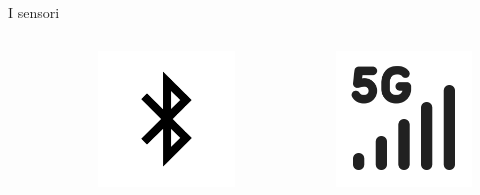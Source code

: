 \documentclass{beamer}
\begin{document}
\begin{frame}{I sensori}
\begin{columns}
\begin{column}{0.15\linewidth}
\begin{figure}
        \end{figure}
    \end{column}
    \begin{column}{0.15\linewidth}
        \begin{figure}
            \centering
            \includegraphics[width=0.9\linewidth]{assets/ic_bluetooth.png}
        \end{figure}
    \end{column}
    \begin{column}{0.15\linewidth}
        \begin{figure}
            \centering
            \includegraphics[width=0.8\linewidth]{assets/ic_cell.png}

\end{figure}
\end{column}
\end{columns}
\end{frame}
\end{document}
